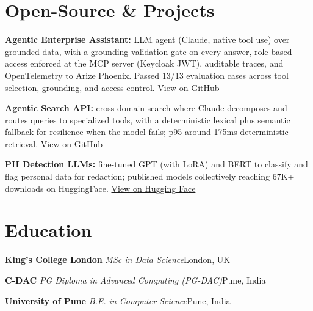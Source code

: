 \documentclass[10pt,a4paper]{article}
\newcommand{\sep}{\,\textcolor{accent!60}{\textbar}\,}
\begin{document}
\section{Open-Source \& Projects}
\begin{tight}
  \item \textbf{Agentic Enterprise Assistant:} LLM agent (Claude, native tool use) over grounded data, with a grounding-validation gate on every answer, role-based access enforced at the MCP server (Keycloak JWT), auditable traces, and OpenTelemetry to Arize Phoenix. Passed 13/13 evaluation cases across tool selection, grounding, and access control. \href{https://github.com/abhijeetscode/Agentic-Enterprise-Assistant}{View on GitHub}
  \item \textbf{Agentic Search API:} cross-domain search where Claude decomposes and routes queries to specialized tools, with a deterministic lexical plus semantic fallback for resilience when the model fails; p95 around 175ms deterministic retrieval. \href{https://github.com/abhijeetscode/search-agent}{View on GitHub}
  \item \textbf{PII Detection LLMs:} fine-tuned GPT (with LoRA) and BERT to classify and flag personal data for redaction; published models collectively reaching 67K+ downloads on HuggingFace. \href{https://huggingface.co/ab-ai/pii_model}{View on Hugging Face}
\end{tight}

\section{Education}
{\color{company}\bfseries King's College London}\sep{\itshape MSc in Data Science}\hfill {\color{muted}London, UK}\par\vspace{1pt}
{\color{company}\bfseries C-DAC}\sep{\itshape PG Diploma in Advanced Computing (PG-DAC)}\hfill {\color{muted}Pune, India}\par\vspace{1pt}
{\color{company}\bfseries University of Pune}\sep{\itshape B.E. in Computer Science}\hfill {\color{muted}Pune, India}\par
\end{document}
